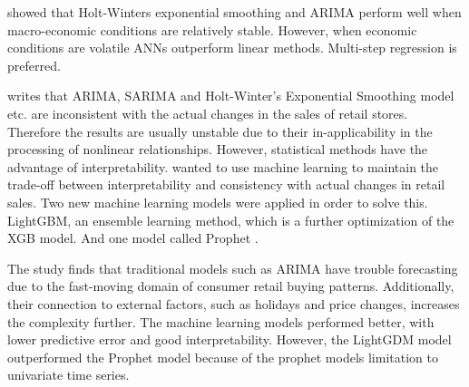 \cite{Chu2003} showed that Holt-Winters exponential smoothing and ARIMA perform well when macro-economic
conditions are relatively stable. However, when economic conditions are volatile
ANNs outperform linear methods.
Multi-step regression is preferred.




\cite{Weng2020} writes that ARIMA, SARIMA and Holt-Winter's
Exponential Smoothing model etc. are inconsistent with the actual changes in the sales
of retail stores.
Therefore the results are usually unstable due to their in-applicability
in the processing of nonlinear relationships.
However, statistical methods have the advantage of interpretability.
\cite{Bowen2020} wanted to use machine learning to maintain
the trade-off between interpretability and consistency with actual
changes in retail sales.
Two new machine learning models were applied in order to solve this.
LightGBM, an ensemble learning method, which is a further optimization of the XGB model.
And one model called Prophet \citep{Zunic2020}.

The study finds that traditional models such as ARIMA have trouble forecasting
due to the fast-moving domain of consumer retail buying patterns.
Additionally, their connection to external factors,
such as holidays and price changes, increases the complexity further.
The machine learning models performed better, with lower predictive error
and good interpretability.
However, the LightGDM model outperformed the Prophet model because of the prophet
models limitation to univariate time series.


